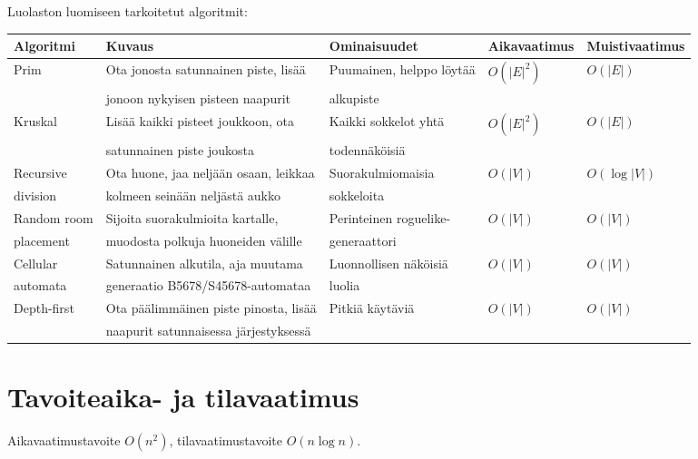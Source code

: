 \documentclass{article}
\begin{document}
\noindent
Luolaston luomiseen tarkoitetut algoritmit:
\begin{table}[h]
\begin{tabular}{| l | p{6.0cm} | l | l | l |}
\hline
\rowcolor{Gray}
Algoritmi   & Kuvaus                                & Ominaisuudet              & Aikavaatimus & Muistivaatimus \\ \hline
Prim        & Ota jonosta satunnainen piste, lisää  & Puumainen, helppo löytää  & $O(|E|^2)$   & $O(|E|)$       \\
            & jonoon nykyisen pisteen naapurit      & alkupiste                 &              &                \\ \hline
Kruskal     & Lisää kaikki pisteet joukkoon, ota    & Kaikki sokkelot yhtä      & $O(|E|^2)$   & $O(|E|)$       \\
            & satunnainen piste joukosta            & todennäköisiä             &              &                \\ \hline
Recursive   & Ota huone, jaa neljään osaan, leikkaa & Suorakulmiomaisia         & $O(|V|)$     & $O(\log |V|)$  \\
division    & kolmeen seinään neljästä aukko        & sokkeloita                &              &                \\ \hline
Random room & Sijoita suorakulmioita kartalle,      & Perinteinen roguelike-    & $O(|V|)$     & $O(|V|)$       \\
placement   & muodosta polkuja huoneiden välille    & generaattori              &              &                \\ \hline
Cellular    & Satunnainen alkutila, aja muutama     & Luonnollisen näköisiä     & $O(|V|)$     & $O(|V|)$       \\
automata    & generaatio B5678/S45678-automataa     & luolia                    &              &                \\ \hline
Depth-first & Ota päälimmäinen piste pinosta, lisää & Pitkiä käytäviä           & $O(|V|)$     & $O(|V|)$       \\
            & naapurit satunnaisessa järjestyksessä &                           &              &                \\ \hline
\end{tabular}
\end{table}

\section{Tavoiteaika- ja tilavaatimus}
Aikavaatimustavoite $O(n^2)$, tilavaatimustavoite $O(n \log n)$.
\end{document}
